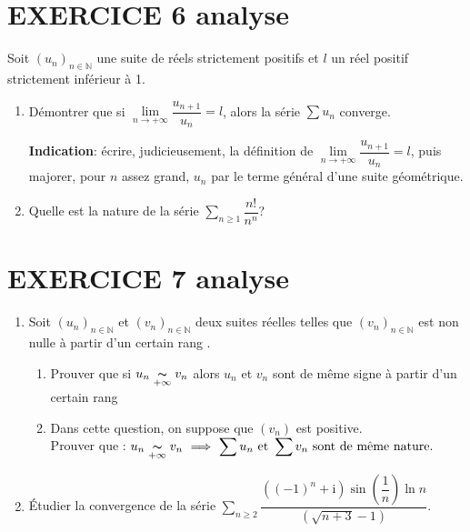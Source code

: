 \documentclass[10pt,oneside]{article}
\begin{document}
\begin{flushleft}
\section*{EXERCICE 6 \:analyse }

Soit $\left( u_{n}\right) _{n\in \mathbb{N}}$ une suite de r\'{e}els strictement positifs et $l$ un r\'{e}el positif strictement inf\'{e}rieur \`{a} 1.

\begin{enumerate}
\item Démontrer que si $\underset{n\rightarrow +\infty }{\lim }\dfrac{u_{n+1}}{u_{n}}=l$, alors la s\'{e}rie $\displaystyle\sum u_{n}$ converge.
 
\textbf{Indication}: écrire, judicieusement, la définition de $\underset{n\rightarrow +\infty }{\lim }\dfrac{u_{n+1}}{u_{n}}=l$,  puis majorer, pour $n$ assez grand, $u_{n}$ par le terme g\'{e}n\'{e}ral d'une suite g\'{e}om\'{e}trique.
\item Quelle est la nature de la série $\displaystyle\sum_{n\geqslant1}{} \dfrac{n!}{n^{n}}$?
\end{enumerate}


\section*{EXERCICE 7 \:analyse }

\begin{enumerate}
\item
Soit  $\left( u_{n}\right)_{n\in \mathbb{N}}$ et $\left( v_{n}\right) _{n\in \mathbb{N}}$  deux suites réelles telles que $(v_n)_{n\in \mathbb{N}}$ est non nulle à partir d'un certain rang .

\begin{enumerate}
\item

Prouver que si  $u_{n}\underset{+\infty}\thicksim v_{n}$ alors $u_{n}$ et $v_{n}$ sont de m\^{e}me signe \`{a} partir d'un certain rang
\item
Dans cette question, on suppose que $(v_n)$ est positive.\\

Prouver que :
$u_{n}\underset{+\infty}{\thicksim} v_{n} \  \Longrightarrow  \ \displaystyle\sum u_{n}\ \text{et }\displaystyle\sum v_{n}\ \text{sont de m\^{e}me nature}.$

\end{enumerate}
\item 
Étudier la convergence de la s\'{e}rie
 $\displaystyle\sum\limits_{n\geqslant 2}^{} \dfrac{\left((-1)^n+\mathrm{i}\right) \sin \left( \dfrac{1}{n}\right) \ln n }{\left(\sqrt{n+3}-1\right)}$.



\end{enumerate}
\end{flushleft}
\end{document}
